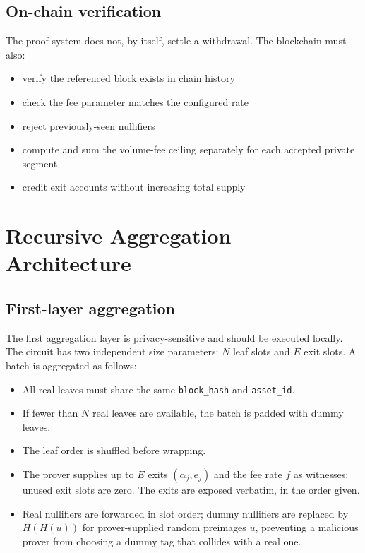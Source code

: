 \documentclass{iacrcc}
\begin{document}
\subsection{On-chain verification}

The proof system does not, by itself, settle a withdrawal. The blockchain must also:
\begin{itemize}[leftmargin=1.5em]
    \item verify the referenced block exists in chain history
    \item check the fee parameter matches the configured rate
    \item reject previously-seen nullifiers
    \item compute and sum the volume-fee ceiling separately for each accepted private segment
    \item credit exit accounts without increasing total supply
\end{itemize}

\section{Recursive Aggregation Architecture}
\label{sec:aggregation}

\subsection{First-layer aggregation}

The first aggregation layer is privacy-sensitive and should be executed locally. The circuit has two independent size parameters: \(N\) leaf slots and \(E\) exit slots. A batch is aggregated as follows:
\begin{itemize}[leftmargin=1.5em]
    \item All real leaves must share the same \texttt{block\_hash} and \texttt{asset\_id}.
    \item If fewer than \(N\) real leaves are available, the batch is padded with dummy leaves.
    \item The leaf order is shuffled before wrapping.
    \item The prover supplies up to \(E\) exits \((\alpha_j, e_j)\) and the fee rate \(f\) as witnesses; unused exit slots are zero. The exits are exposed verbatim, in the order given.
    \item Real nullifiers are forwarded in slot order; dummy nullifiers are replaced by \(H(H(u))\) for prover-supplied random preimages \(u\), preventing a malicious prover from choosing a dummy tag that collides with a real one.
\end{itemize}
\end{document}
